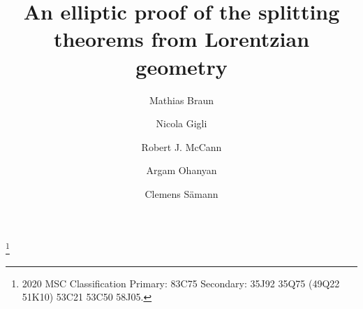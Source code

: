 \documentclass[12pt]{amsart}
\begin{document}
\title[An elliptic proof of the Lorentzian splitting theorems]
{An elliptic proof of the splitting theorems from Lorentzian geometry}
\author[Braun]{Mathias Braun}
\address{Institute of Mathematics, EPFL, 1015 Lausanne, Switzerland\newline \tt mathias.braun@epfl.ch}
\author[Gigli]{Nicola Gigli}\address{SISSA, Trieste, Italy\newline \tt ngigli@sissa.it}
\author[McCann]{Robert J. McCann}
\address{Departments of Mathematics and Economics, University of Toronto, Toronto, Ontario, Canada\newline \tt mccann@math.toronto.edu}
\author[Ohanyan]{Argam Ohanyan}
\address{Department of Mathematics, University of Toronto, Toronto, Ontario, Canada\newline \tt argam.ohanyan@utoronto.ca}
\author[S\"amann]{Clemens S\"amann}
\address{{Faculty of Mathematics, University of Vienna, Vienna, Austria\newline \tt clemens.saemann@univie.ac.at}}

\thanks{2020 MSC Classification Primary: 83C75 Secondary: 35J92 35Q75 (49Q22 51K10) 53C21 53C50 58J05.} 

\end{document}
